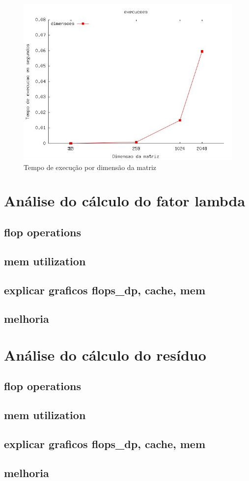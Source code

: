 \documentclass[12pt]{article}
\begin{document}
\begin{figure}[htb] \begin{center}
\includegraphics[width=150mm]{execucoes.jpg} \end{center}
\caption{Tempo de execução por dimensão da matriz}\label{fig:execucao}
\end{figure}

\section{Análise do cálculo do fator lambda}\label{sec:lambda}
\subsection{flop operations}
\subsection{mem utilization}
\subsection{explicar graficos flops\_dp, cache, mem}
\subsection{melhoria}

\section{Análise do cálculo do resíduo}\label{sec:residuo}
\subsection{flop operations}
\subsection{mem utilization}
\subsection{explicar graficos flops\_dp, cache, mem}
\subsection{melhoria}
\end{document}
